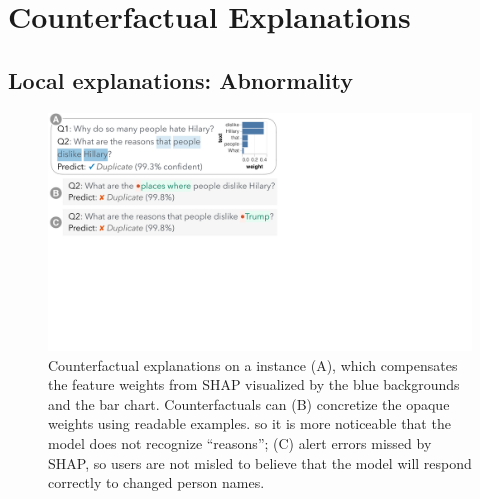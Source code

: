 
\newcommand{\fwone}[1]{\colbox{cfwone}{#1}\xspace}
\newcommand{\fwtwo}[1]{\colbox{cfwtwo}{#1}\xspace}
\newcommand{\fwthree}[1]{\colbox{cfwthree}{#1}\xspace}
\newcommand{\fwfour}[1]{\colbox{cfwfour}{#1}\xspace}

\newcommand{\fexp}[2]{\texttt{[{\color{darkgray}{#1:#2}}]}\xspace}
\newcommand{\fexptag}[1]{\fexp{TAG}{#1}}
\newcommand{\fexpfrom}[1]{\fexp{FROM}{#1}}
\newcommand{\fexpto}[1]{\fexp{TO}{#1}}
\newcommand{\fexptemp}[1]{\fexp{TEMP}{#1}}


\section{Counterfactual Explanations}


\subsection{Local explanations: Abnormality}





\begin{figure}[t]
\centering
\includegraphics[trim={0 18cm 31cm 0cm},clip,width=1\columnwidth]{figures/explanation_v2}
\vspace{-15pt}
\caption{
Counterfactual explanations on a \qqp instance (A), which compensates the feature weights from SHAP visualized by the blue backgrounds and the bar chart.
Counterfactuals can 
(B) concretize the opaque weights using readable examples. so it is more noticeable that the model does not recognize ``reasons'';
(C) alert errors missed by SHAP, so users are not misled to believe that the model will respond correctly to changed person names.
}
\vspace{-10pt}
\label{fig:explanation}
\end{figure}

